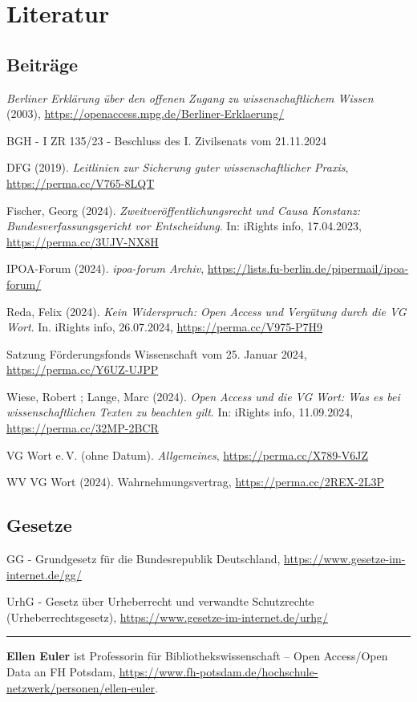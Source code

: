 \documentclass[a4paper,
fontsize=11pt,
oneside,
numbers=noperiodatend,
parskip=half-,
bibliography=totoc,
final
]{scrartcl}
\begin{document}
\section{Literatur}\label{literatur}

\subsection{Beiträge}\label{beitruxe4ge}

\emph{Berliner Erklärung über den offenen Zugang zu wissenschaftlichem
Wissen} (2003), \url{https://openaccess.mpg.de/Berliner-Erklaerung/}

BGH - I ZR 135/23 - Beschluss des I. Zivilsenats vom 21.11.2024

DFG (2019). \emph{Leitlinien zur Sicherung guter wissenschaftlicher
Praxis}, \url{https://perma.cc/V765-8LQT}

Fischer, Georg (2024). \emph{Zweitveröffentlichungsrecht und Causa
Konstanz: Bundesverfassungsgericht vor Entscheidung}. In: iRights info,
17.04.2023, \url{https://perma.cc/3UJV-NX8H}

IPOA-Forum (2024). \emph{ipoa-forum Archiv},
\url{https://lists.fu-berlin.de/pipermail/ipoa-forum/}

Reda, Felix (2024). \emph{Kein Widerspruch: Open Access und Vergütung
durch die VG Wort}. In. iRights info, 26.07.2024,
\url{https://perma.cc/V975-P7H9}

Satzung Förderungsfonds Wissenschaft vom 25. Januar 2024,
\url{https://perma.cc/Y6UZ-UJPP}

Wiese, Robert ; Lange, Marc (2024). \emph{Open Access und die VG Wort:
Was es bei wissenschaftlichen Texten zu beachten gilt}. In: iRights
info, 11.09.2024, \url{https://perma.cc/32MP-2BCR}

VG Wort e.\,V. (ohne Datum). \emph{Allgemeines},
\url{https://perma.cc/X789-V6JZ}

WV VG Wort (2024). Wahrnehmungsvertrag, \url{https://perma.cc/2REX-2L3P}

\subsection{Gesetze}\label{gesetze}

GG - Grundgesetz für die Bundesrepublik Deutschland,
\url{https://www.gesetze-im-internet.de/gg/}

UrhG - Gesetz über Urheberrecht und verwandte Schutzrechte
(Urheberrechtsgesetz), \url{https://www.gesetze-im-internet.de/urhg/}

\begin{center}\rule{0.5\linewidth}{0.5pt}\end{center}

\textbf{Ellen Euler} ist Professorin für Bibliothekswissenschaft -- Open
Access/Open Data an FH Potsdam,
\url{https://www.fh-potsdam.de/hochschule-netzwerk/personen/ellen-euler}.
\end{document}
